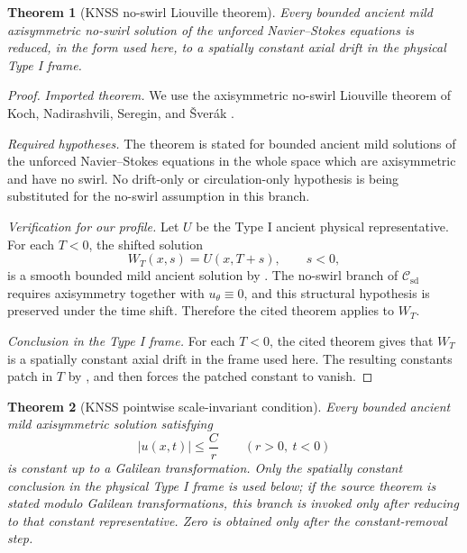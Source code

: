 \documentclass[11pt]{amsart}
\theoremstyle{plain}
\newtheorem{theorem}{Theorem}[section]
\theoremstyle{definition}
\theoremstyle{remark}
\numberwithin{equation}{section}
\newcommand{\calC}{\mathcal C}
\begin{document}
\begin{theorem}[KNSS no-swirl Liouville theorem]
\label{p3:thm:knss-noswirl}
Every bounded ancient mild axisymmetric no-swirl solution of the unforced
Navier--Stokes equations is reduced, in the form used here, to a spatially
constant axial drift in the physical Type I frame.
\end{theorem}

\begin{proof}
\smallskip
\noindent\emph{Imported theorem.}
We use the axisymmetric no-swirl Liouville theorem of
Koch, Nadirashvili, Seregin, and \v{S}ver\'ak
\cite[Theorem 5.2]{KNSS2009}.

\smallskip
\noindent\emph{Required hypotheses.}
The theorem is stated for bounded ancient mild solutions of the unforced
Navier--Stokes equations in the whole space which are axisymmetric and have no
swirl.  No drift-only or circulation-only hypothesis is being substituted for
the no-swirl assumption in this branch.

\smallskip
\noindent\emph{Verification for our profile.}
Let \(U\) be the Type I ancient physical representative.  For each \(T<0\),
the shifted solution
\[
   W_T(x,s)=U(x,T+s),\qquad s<0,
\]
is a smooth bounded mild ancient solution by .  The
no-swirl branch of \(\calC_{\mathrm{sd}}\) requires axisymmetry together with
\(u_\theta\equiv0\), and this structural hypothesis is preserved under the
time shift.  Therefore the cited theorem applies to \(W_T\).

\smallskip
\noindent\emph{Conclusion in the Type I frame.}
For each \(T<0\), the cited theorem gives that \(W_T\) is a spatially
constant axial drift in the frame used here.  The resulting constants patch in
\(T\) by
, and  then
forces the patched constant to vanish.
\end{proof}

\begin{theorem}[KNSS pointwise scale-invariant condition]
\label{p3:thm:knss-pointwise}
Every bounded ancient mild axisymmetric solution satisfying
\[
   |u(x,t)|\le \frac{C}{r}
   \qquad(r>0,\ t<0)
\]
is constant up to a Galilean transformation.  Only the spatially constant
conclusion in the physical Type I frame is used below; if the source theorem is
stated modulo Galilean transformations, this branch is invoked only after
reducing to that constant representative.  Zero is obtained only after the
constant-removal step.
\end{theorem}
\end{document}

